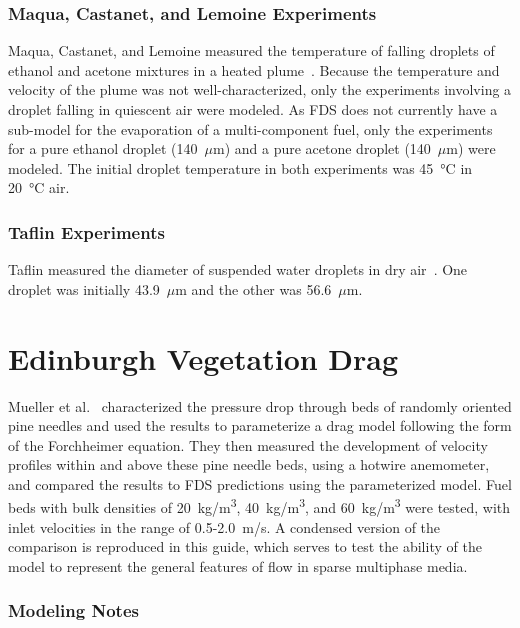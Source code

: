 \subsubsection{Maqua, Castanet, and Lemoine Experiments}
\label{Maqua_exp}

Maqua, Castanet, and Lemoine measured the temperature of falling droplets of ethanol and acetone mixtures in a heated plume~\cite{Maqua}. Because the temperature and velocity of the plume was not well-characterized, only the experiments involving a droplet falling in quiescent air were modeled. As FDS does not currently have a sub-model for the evaporation of a multi-component fuel, only the experiments for a pure ethanol droplet (140~$\mu$m) and a pure acetone droplet (140~$\mu$m) were modeled. The initial droplet temperature in both experiments was 45~\unit{\degreeCelsius} in 20~\unit{\degreeCelsius} air.

\subsubsection{Taflin Experiments}
\label{Taflin_exp}

Taflin measured the diameter of suspended water droplets in dry air~\cite{Snegirev:1}. One droplet was initially 43.9~$\mu$m and the other was 56.6~$\mu$m.

\section{Edinburgh Vegetation Drag}
\label{Edinburgh_Veg_Drag_Description}

Mueller et al.~\cite{Mueller:TIPM2021} characterized the pressure drop through beds of randomly oriented pine needles and used the results to parameterize a drag model following the form of the Forchheimer equation. They then measured the development of velocity profiles within and above these pine needle beds, using a hotwire anemometer, and compared the results to FDS predictions using the parameterized model. Fuel beds with bulk densities of 20~\unit{kg/m^3}, 40~\unit{kg/m^3}, and 60~\unit{kg/m^3} were tested, with inlet velocities in the range of 0.5-2.0~m/s. A condensed version of the comparison is reproduced in this guide, which serves to test the ability of the model to represent the general features of flow in sparse multiphase media.

\subsubsection{Modeling Notes}

